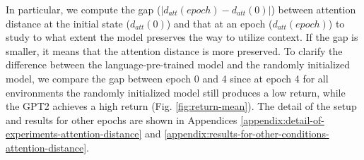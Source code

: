 In particular, we compute the gap ($|d_{att}(epoch) - d_{att}(0)|$) between attention distance at the initial state ($d_{att}(0)$) and that at an epoch ($d_{att}(epoch)$) to study to what extent the model preserves the way to utilize context. If the gap is smaller, it means that the attention distance is more preserved. To clarify the difference between the language-pre-trained model and the randomly initialized model, we compare the gap between epoch 0 and 4 since at epoch 4 for all environments the randomly initialized model still produces a low return, while the GPT2 achieves a high return (Fig. \ref{fig:return-mean}). The detail of the setup and results for other epochs are shown in Appendices \ref{appendix:detail-of-experiments-attention-distance} and \ref{appendix:results-for-other-conditions-attention-distance}. 

